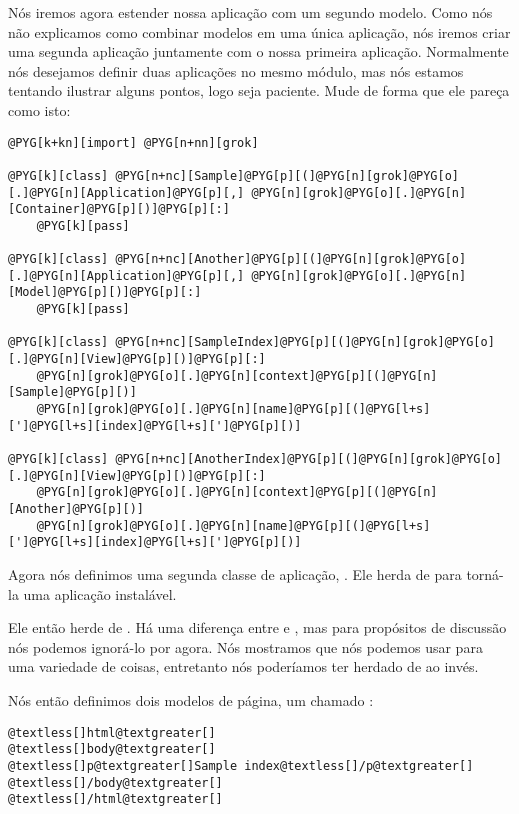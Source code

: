 \documentclass[a4paper,12pt,portuguese]{manual}
\begin{document}
Nós iremos agora estender nossa aplicação com um segundo modelo. Como
nós não explicamos como combinar modelos em uma única aplicação, nós iremos
criar uma segunda aplicação juntamente com o nossa primeira aplicação.
Normalmente nós desejamos definir duas aplicações no mesmo módulo, mas
nós estamos tentando ilustrar alguns pontos, logo seja paciente. Mude
 de forma que ele pareça como isto:

\begin{Verbatim}[commandchars=@\[\]]
@PYG[k+kn][import] @PYG[n+nn][grok]
  
@PYG[k][class] @PYG[n+nc][Sample]@PYG[p][(]@PYG[n][grok]@PYG[o][.]@PYG[n][Application]@PYG[p][,] @PYG[n][grok]@PYG[o][.]@PYG[n][Container]@PYG[p][)]@PYG[p][:]
    @PYG[k][pass]

@PYG[k][class] @PYG[n+nc][Another]@PYG[p][(]@PYG[n][grok]@PYG[o][.]@PYG[n][Application]@PYG[p][,] @PYG[n][grok]@PYG[o][.]@PYG[n][Model]@PYG[p][)]@PYG[p][:]
    @PYG[k][pass]

@PYG[k][class] @PYG[n+nc][SampleIndex]@PYG[p][(]@PYG[n][grok]@PYG[o][.]@PYG[n][View]@PYG[p][)]@PYG[p][:]
    @PYG[n][grok]@PYG[o][.]@PYG[n][context]@PYG[p][(]@PYG[n][Sample]@PYG[p][)]
    @PYG[n][grok]@PYG[o][.]@PYG[n][name]@PYG[p][(]@PYG[l+s][']@PYG[l+s][index]@PYG[l+s][']@PYG[p][)]
    
@PYG[k][class] @PYG[n+nc][AnotherIndex]@PYG[p][(]@PYG[n][grok]@PYG[o][.]@PYG[n][View]@PYG[p][)]@PYG[p][:]
    @PYG[n][grok]@PYG[o][.]@PYG[n][context]@PYG[p][(]@PYG[n][Another]@PYG[p][)]
    @PYG[n][grok]@PYG[o][.]@PYG[n][name]@PYG[p][(]@PYG[l+s][']@PYG[l+s][index]@PYG[l+s][']@PYG[p][)]
\end{Verbatim}

Agora nós definimos uma segunda classe de aplicação,
. Ele herda de  para torná-la uma
aplicação instalável.

Ele então herde de . Há uma diferença entre
 e , mas para propósitos de discussão
nós podemos ignorá-lo por agora. Nós mostramos que nós podemos usar
 para uma variedade de coisas, entretanto nós poderíamos ter
herdado de  ao invés.

Nós então definimos dois modelos de página, um chamado
:

\begin{Verbatim}[commandchars=@\[\]]
@textless[]html@textgreater[]
@textless[]body@textgreater[]
@textless[]p@textgreater[]Sample index@textless[]/p@textgreater[]
@textless[]/body@textgreater[]
@textless[]/html@textgreater[]
\end{Verbatim}
\end{document}
